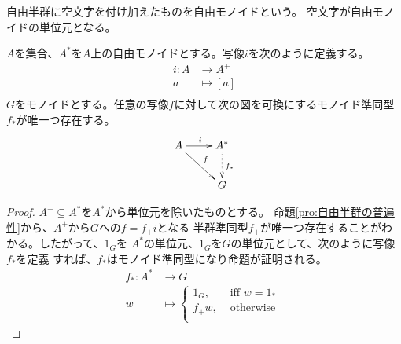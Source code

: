 	\begin{definition}[自由モノイド]\label{def:自由モノイド} %
		自由半群に空文字を付け加えたものを自由モノイドという。
		空文字が自由モノイドの単位元となる。
	\end{definition} %

	\begin{proposition}[自由モノイドの普遍性]\label{pro:自由モノイドの普遍性} %
		$A$を集合、$A^*$を$A$上の自由モノイドとする。写像$i$を次のように定義する。
		\begin{equation}\begin{split} %
			i: A &\to A^+ \\
				a &\mapsto [a] \\
		\end{split}\end{equation} %
		$G$をモノイドとする。任意の写像$f$に対して次の図を可換にするモノイド準同型
		$f_*$が唯一つ存在する。
		\begin{equation}\xymatrix{
			A \ar[r]^i \ar[rd]^{f} & A^* \ar@{.>}[d]^{f_*} \\
			& G \\
		}\end{equation}
	\end{proposition} %
	\begin{proof}
		$A^+\subseteq A^*$を$A^*$から単位元を除いたものとする。
		命題\ref{pro:自由半群の普遍性}から、$A^+$から$G$への$f=f_+i$となる
		半群準同型$f_+$が唯一つ存在することがわかる。したがって、$1_G$を
		$A^*$の単位元、$1_G$を$G$の単位元として、次のように写像$f_*$を定義
		すれば、$f_*$はモノイド準同型になり命題が証明される。
		\begin{equation*}\begin{split} %
			f_*: A^*&\to G \\
				w &\mapsto \begin{cases}
					1_G, &\text{ iff }w=1_* \\
					f_+w, &\text{ otherwise } \\
				\end{cases}
		\end{split}\end{equation*} %
	\end{proof}

